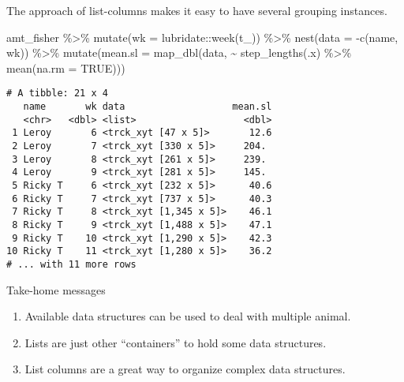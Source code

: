 \documentclass[ignorenonframetext,,t]{beamer}
\providecommand{\tightlist}{%
\setlength{\itemsep}{0pt}\setlength{\parskip}{0pt}}
\newenvironment{Shaded}{\begin{snugshade}}{\end{snugshade}}
\newcommand{\AttributeTok}[1]{\textcolor[rgb]{0.77,0.63,0.00}{#1}}
\newcommand{\ConstantTok}[1]{\textcolor[rgb]{0.00,0.00,0.00}{#1}}
\newcommand{\FunctionTok}[1]{\textcolor[rgb]{0.00,0.00,0.00}{#1}}
\newcommand{\NormalTok}[1]{#1}
\newcommand{\SpecialCharTok}[1]{\textcolor[rgb]{0.00,0.00,0.00}{#1}}
\providecommand{\tightlist}{%
\setlength{\itemsep}{0pt}\setlength{\parskip}{0pt}}
\renewcommand{\tightlist}{\setlength{\itemsep}{1.4ex}\setlength{\parskip}{0pt}}
\begin{document}
\begin{frame}[fragile]
The approach of list-columns makes it easy to have several grouping
instances.

\begin{Shaded}
\begin{Highlighting}[]
\NormalTok{amt\_fisher }\SpecialCharTok{\%\textgreater{}\%} \FunctionTok{mutate}\NormalTok{(}\AttributeTok{wk =}\NormalTok{ lubridate}\SpecialCharTok{::}\FunctionTok{week}\NormalTok{(t\_)) }\SpecialCharTok{\%\textgreater{}\%} 
  \FunctionTok{nest}\NormalTok{(}\AttributeTok{data =} \SpecialCharTok{{-}}\FunctionTok{c}\NormalTok{(name, wk)) }\SpecialCharTok{\%\textgreater{}\%} 
  \FunctionTok{mutate}\NormalTok{(}\AttributeTok{mean.sl =} \FunctionTok{map\_dbl}\NormalTok{(data, }\SpecialCharTok{\textasciitilde{}} \FunctionTok{step\_lengths}\NormalTok{(.x) }\SpecialCharTok{\%\textgreater{}\%} 
                             \FunctionTok{mean}\NormalTok{(}\AttributeTok{na.rm =} \ConstantTok{TRUE}\NormalTok{)))}
\end{Highlighting}
\end{Shaded}

\begin{verbatim}
# A tibble: 21 x 4
   name       wk data                   mean.sl
   <chr>   <dbl> <list>                   <dbl>
 1 Leroy       6 <trck_xyt [47 x 5]>       12.6
 2 Leroy       7 <trck_xyt [330 x 5]>     204. 
 3 Leroy       8 <trck_xyt [261 x 5]>     239. 
 4 Leroy       9 <trck_xyt [281 x 5]>     145. 
 5 Ricky T     6 <trck_xyt [232 x 5]>      40.6
 6 Ricky T     7 <trck_xyt [737 x 5]>      40.3
 7 Ricky T     8 <trck_xyt [1,345 x 5]>    46.1
 8 Ricky T     9 <trck_xyt [1,488 x 5]>    47.1
 9 Ricky T    10 <trck_xyt [1,290 x 5]>    42.3
10 Ricky T    11 <trck_xyt [1,280 x 5]>    36.2
# ... with 11 more rows
\end{verbatim}
\end{frame}

\begin{frame}{Take-home messages}
\protect\hypertarget{take-home-messages}{}
\begin{enumerate}
\tightlist
\item
  Available data structures can be used to deal with multiple animal.
\item
  Lists are just other ``containers'' to hold some data structures.
\item
  List columns are a great way to organize complex data structures.
\end{enumerate}
\end{frame}
\end{document}
